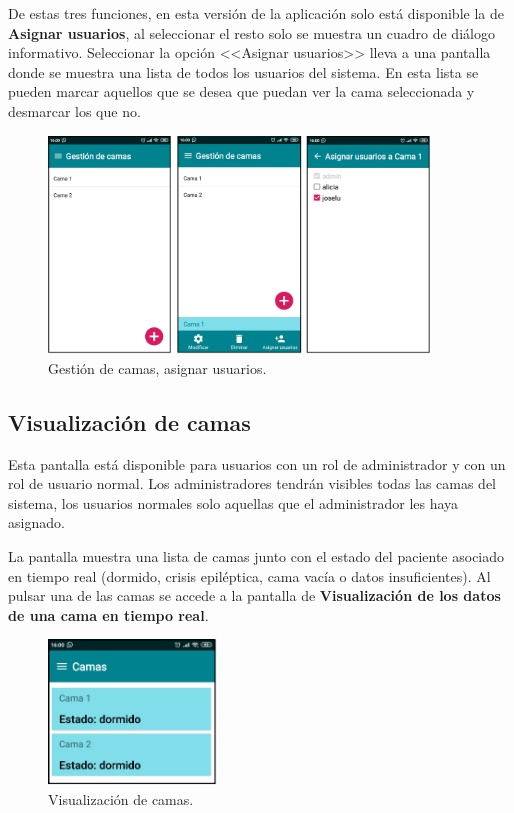 De estas tres funciones, en esta versión de la aplicación solo está disponible la de \textbf{Asignar usuarios}, al seleccionar el resto solo se muestra un cuadro de diálogo informativo. Seleccionar la opción <<Asignar usuarios>> lleva a una pantalla donde se muestra una lista de todos los usuarios del sistema. En esta lista se pueden marcar aquellos que se desea que puedan ver la cama seleccionada y desmarcar los que no. 

\begin{figure}[H]
	\centering
	\includegraphics[width=0.9\textwidth]{../img/gestiondecamas.png}
	\caption{Gestión de camas, asignar usuarios.}
	\label{fig:gestiondecamas}
\end{figure}

\subsection{Visualización de camas}

Esta pantalla está disponible para usuarios con un rol de administrador y con un rol de usuario normal. Los administradores tendrán visibles todas las camas del sistema, los usuarios normales solo aquellas que el administrador les haya asignado. 

La pantalla muestra una lista de camas junto con el estado del paciente asociado en tiempo real (dormido, crisis epiléptica, cama vacía o datos insuficientes). Al pulsar una de las camas se accede a la pantalla de \textbf{Visualización de los datos de una cama en tiempo real}. 

\begin{figure}[H]
	\centering
	\includegraphics[width=0.4\textwidth]{../img/visualizaciondecamas.png}
	\caption{Visualización de camas.}
	\label{fig:visualizaciondecamas}
\end{figure}

